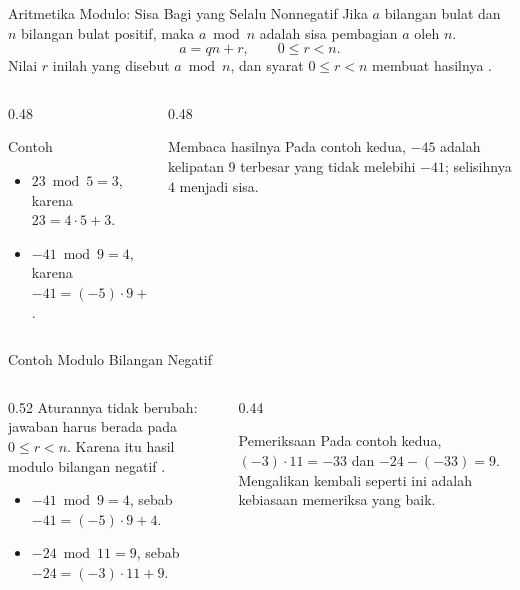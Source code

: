 \documentclass[aspectratio=169,11pt]{beamer}
\begin{document}
\begin{frame}{Aritmetika Modulo: Sisa Bagi yang Selalu Nonnegatif}
    Jika $a$ bilangan bulat dan $n$ bilangan bulat positif, maka $a \bmod n$
    adalah sisa pembagian $a$ oleh $n$.
    \[ a = qn + r, \qquad 0 \le r < n. \]
    Nilai $r$ inilah yang disebut $a \bmod n$, dan syarat $0 \le r < n$ membuat
    hasilnya .
    \vspace{0.1cm}
    \begin{columns}[T,onlytextwidth]
        \begin{column}{0.48\textwidth}
            \begin{block}{Contoh}
                \begin{itemize}
                    \item $23 \bmod 5 = 3$, karena $23 = 4 \cdot 5 + 3$.
                    \item $-41 \bmod 9 = 4$, karena
                          $-41 = (-5)\cdot 9 + 4$.
                \end{itemize}
            \end{block}
        \end{column}
        \begin{column}{0.48\textwidth}
            \begin{exampleblock}{Membaca hasilnya}
                Pada contoh kedua, $-45$ adalah kelipatan 9 terbesar yang tidak
                melebihi $-41$; selisihnya $4$ menjadi sisa.
            \end{exampleblock}
        \end{column}
    \end{columns}
\end{frame}

\begin{frame}{Contoh Modulo Bilangan Negatif}
    \begin{columns}[T,onlytextwidth]
        \begin{column}{0.52\textwidth}
            Aturannya tidak berubah: jawaban harus berada pada $0 \le r < n$.
            Karena itu hasil modulo bilangan negatif .
            \vspace{0.2cm}
            \begin{itemize}
                \item $-41 \bmod 9 = 4$, sebab
                      $-41 = (-5)\cdot 9 + 4$.
                \item $-24 \bmod 11 = 9$, sebab
                      $-24 = (-3)\cdot 11 + 9$.
            \end{itemize}
        \end{column}
        \begin{column}{0.44\textwidth}
            \begin{exampleblock}{Pemeriksaan}
                Pada contoh kedua, $(-3)\cdot 11 = -33$ dan
                $-24 - (-33) = 9$. Mengalikan kembali seperti ini adalah
                kebiasaan memeriksa yang baik.
            \end{exampleblock}
        \end{column}
    \end{columns}
\end{frame}
\end{document}
